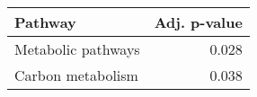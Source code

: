 \begin{tabular}{lr}
\toprule
            Pathway &  Adj. p-value \\
\midrule
 Metabolic pathways &         0.028 \\
  Carbon metabolism &         0.038 \\
\bottomrule
\end{tabular}
